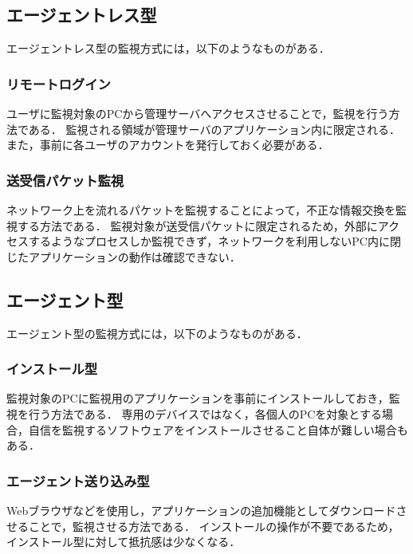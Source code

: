 \subsection{エージェントレス型}
エージェントレス型の監視方式には，以下のようなものがある．

\subsubsection{リモートログイン}
ユーザに監視対象のPCから管理サーバへアクセスさせることで，監視を行う方法である．
監視される領域が管理サーバのアプリケーション内に限定される．
また，事前に各ユーザのアカウントを発行しておく必要がある．

\subsubsection{送受信パケット監視}
ネットワーク上を流れるパケットを監視することによって，不正な情報交換を監視する方法である．
監視対象が送受信パケットに限定されるため，外部にアクセスするようなプロセスしか監視できず，ネットワークを利用しないPC内に閉じたアプリケーションの動作は確認できない．

\subsection{エージェント型}
エージェント型の監視方式には，以下のようなものがある．

\subsubsection{インストール型}
監視対象のPCに監視用のアプリケーションを事前にインストールしておき，監視を行う方法である．
専用のデバイスではなく，各個人のPCを対象とする場合，自信を監視するソフトウェアをインストールさせること自体が難しい場合もある．

\subsubsection{エージェント送り込み型}
Webブラウザなどを使用し，アプリケーションの追加機能としてダウンロードさせることで，監視させる方法である．
インストールの操作が不要であるため，インストール型に対して抵抗感は少なくなる．


